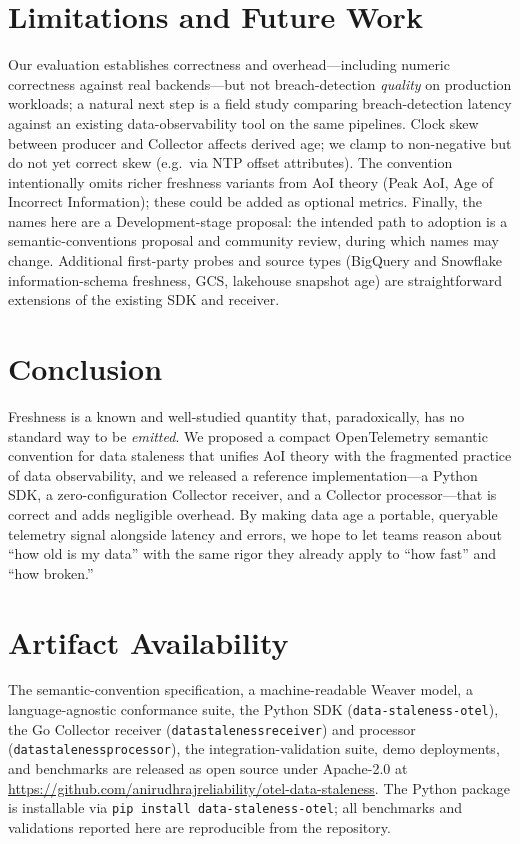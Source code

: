 \documentclass[11pt]{article}
\begin{document}
\section{Limitations and Future Work}
\label{sec:limits}
Our evaluation establishes correctness and overhead---including numeric
correctness against real backends---but not breach-detection \emph{quality} on
production workloads; a natural next step is a field study comparing
breach-detection latency against an existing data-observability tool on the same
pipelines. Clock skew between producer and Collector affects derived age; we
clamp to non-negative but do not yet correct skew (e.g.\ via NTP offset
attributes). The convention intentionally omits richer freshness variants from
AoI theory (Peak AoI, Age of Incorrect Information); these could be added as
optional metrics. Finally, the names here are a Development-stage proposal: the
intended path to adoption is a semantic-conventions proposal and community
review, during which names may change. Additional first-party probes and source types (BigQuery and Snowflake
information-schema freshness, GCS, lakehouse snapshot age) are straightforward
extensions of the existing SDK and receiver.

\section{Conclusion}
Freshness is a known and well-studied quantity that, paradoxically, has no
standard way to be \emph{emitted}. We proposed a compact OpenTelemetry semantic
convention for data staleness that unifies AoI theory with the fragmented
practice of data observability, and we released a reference implementation---a Python SDK, a zero-configuration
Collector receiver, and a Collector processor---that is correct and adds
negligible overhead. By making data age a portable, queryable telemetry signal alongside
latency and errors, we hope to let teams reason about ``how old is my data''
with the same rigor they already apply to ``how fast'' and ``how broken.''

\section*{Artifact Availability}
The semantic-convention specification, a machine-readable Weaver model, a
language-agnostic conformance suite, the Python SDK (\texttt{data-staleness-otel}),
the Go Collector receiver (\texttt{datastalenessreceiver}) and processor
(\texttt{datastalenessprocessor}), the integration-validation suite, demo
deployments, and benchmarks are released as open source under Apache-2.0 at
\url{https://github.com/anirudhrajreliability/otel-data-staleness}. The Python
package is installable via \texttt{pip install data-staleness-otel}; all
benchmarks and validations reported here are reproducible from the repository.
\end{document}
